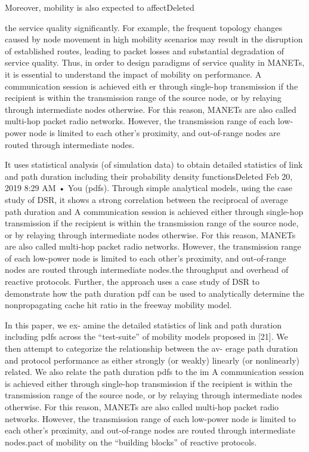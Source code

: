\documentclass[letterpaper, 10 pt, conference]{ieeeconf}  %
\begin{document}
Moreover, mobility is also expected to affectDeleted 

the service quality significantly. For example, the frequent
topology changes caused by node movement in high mobility
scenarios may result in the disruption of established routes,
leading to packet losses and substantial degradation of service
quality. Thus, in order to design paradigms of service quality in
MANETs, it is essential to understand the impact of mobility
on performance.
 A communication session is achieved eith er
through single-hop transmission if the recipient is
within the transmission range of the source node,
or by relaying through intermediate nodes otherwise.
For this reason, MANETs are also called
multi-hop packet radio networks. However, the
transmission range of each low-power node is limited
to each other’s proximity, and out-of-range
nodes are routed through intermediate nodes.



 It uses statistical
analysis (of simulation data) to obtain detailed statistics of link
and path duration including their probability density functionsDeleted 
Feb 20, 2019 8:29 AM • You
(pdfs). Through simple analytical models, using the case study
of DSR, it shows a strong correlation between the reciprocal
of average path duration and  A communication session is achieved either
through single-hop transmission if the recipient is
within the transmission range of the source node,
or by relaying through intermediate nodes otherwise.
For this reason, MANETs are also called
multi-hop packet radio networks. However, the
transmission range of each low-power node is limited
to each other’s proximity, and out-of-range
nodes are routed through intermediate nodes.the throughput and overhead of
reactive protocols. Further, the approach uses a case study of
DSR to demonstrate how the path duration pdf can be used to
analytically determine the nonpropagating cache hit ratio in the
freeway mobility model.



 In this paper, we ex-
amine the detailed statistics of link and path duration including
pdfs across the “test-suite” of mobility models proposed in [21].
We then attempt to categorize the relationship between the av-
erage path duration and protocol performance as either strongly
(or weakly) linearly (or nonlinearly) related. We also relate the
path duration pdfs to the im A communication session is achieved either
through single-hop transmission if the recipient is
within the transmission range of the source node,
or by relaying through intermediate nodes otherwise.
For this reason, MANETs are also called
multi-hop packet radio networks. However, the
transmission range of each low-power node is limited
to each other’s proximity, and out-of-range
nodes are routed through intermediate nodes.pact of mobility on the “building
blocks” of reactive protocols. \cite{Bai2004ModelingProtocolsb}
\end{document}
